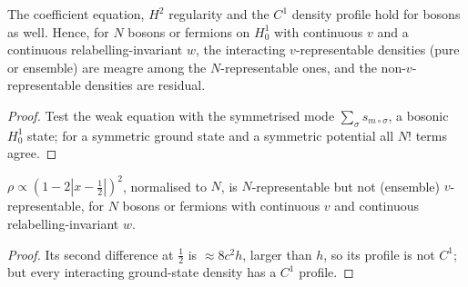\begin{theorem}
  \label{thm:line_vrep_meagre}
  \leanok
  The coefficient equation, $H^2$ regularity and the $C^1$ density profile hold for bosons as well. Hence, for $N$
  bosons or fermions on $H^1_0$ with continuous $v$ and a continuous relabelling-invariant $w$, the interacting
  $v$-representable densities (pure or ensemble) are meagre among the $N$-representable ones, and the
  non-$v$-representable densities are residual.
\end{theorem}
\begin{proof}
  \leanok
  Test the weak equation with the symmetrised mode $\sum_\sigma s_{m\circ\sigma}$, a bosonic $H^1_0$ state; for a
  symmetric ground state and a symmetric potential all $N!$ terms agree.
\end{proof}

\begin{theorem}
  \label{thm:line_kink}
  \leanok
  $\rho\propto(1-2|x-\tfrac12|)^2$, normalised to $N$, is $N$-representable but not (ensemble) $v$-representable, for
  $N$ bosons or fermions with continuous $v$ and continuous relabelling-invariant $w$.
\end{theorem}
\begin{proof}
  \leanok
  Its second difference at $\tfrac12$ is $\approx 8c^2h$, larger than $h$, so its profile is not $C^1$; but every
  interacting ground-state density has a $C^1$ profile.
\end{proof}

